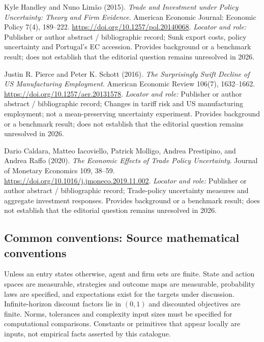 \documentclass[11pt,a4paper]{article}
\begin{document}
\begin{enumerate}[label={[S\arabic*]},leftmargin=*]

\item Kyle Handley and Nuno Limão (2015). \emph{Trade and Investment under Policy Uncertainty: Theory and Firm Evidence}. American Economic Journal: Economic Policy 7(4), 189–222. \url{https://doi.org/10.1257/pol.20140068}.
\textit{Locator and role:} Publisher or author abstract / bibliographic record; Sunk export costs, policy uncertainty and Portugal’s EC accession. Provides background or a benchmark result; does not establish that the editorial question remains unresolved in 2026.

\item Justin R. Pierce and Peter K. Schott (2016). \emph{The Surprisingly Swift Decline of US Manufacturing Employment}. American Economic Review 106(7), 1632–1662. \url{https://doi.org/10.1257/aer.20131578}.
\textit{Locator and role:} Publisher or author abstract / bibliographic record; Changes in tariff risk and US manufacturing employment; not a mean-preserving uncertainty experiment. Provides background or a benchmark result; does not establish that the editorial question remains unresolved in 2026.

\item Dario Caldara, Matteo Iacoviello, Patrick Molligo, Andrea Prestipino, and Andrea Raffo (2020). \emph{The Economic Effects of Trade Policy Uncertainty}. Journal of Monetary Economics 109, 38–59. \url{https://doi.org/10.1016/j.jmoneco.2019.11.002}.
\textit{Locator and role:} Publisher or author abstract / bibliographic record; Trade-policy uncertainty measures and aggregate investment responses. Provides background or a benchmark result; does not establish that the editorial question remains unresolved in 2026.

\end{enumerate}

\subsection*{Common conventions: Source mathematical conventions}

Unless an entry states otherwise, agent and firm sets are finite. State and action spaces are measurable, strategies and outcome maps are measurable, probability laws are specified, and expectations exist for the targets under discussion. Infinite-horizon discount factors lie in $(0,1)$ and discounted objectives are finite. Norms, tolerances and complexity input sizes must be specified for computational comparisons. Constants or primitives that appear locally are inputs, not empirical facts asserted by this catalogue.
\end{document}
